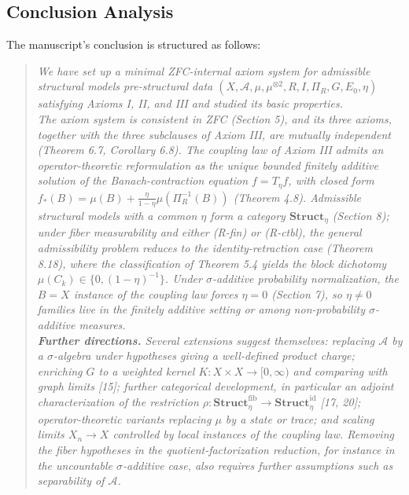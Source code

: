 \documentclass[11pt, a4paper]{article}
\begin{document}
\subsection{Conclusion Analysis}

The manuscript's conclusion is structured as follows:

\begin{quote}
    \small \textit{
    We have set up a minimal ZFC-internal axiom system for admissible structural models pre-structural data $(X, \mathcal{A}, \mu, \mu^{\otimes 2}, R, I, \Pi_R, G, E_0, \eta)$ satisfying Axioms I, II, and III and studied its basic properties. \\
    \indent The axiom system is consistent in ZFC (Section 5), and its three axioms, together with the three subclauses of Axiom III, are mutually independent (Theorem 6.7, Corollary 6.8). The coupling law of Axiom III admits an operator-theoretic reformulation as the unique bounded finitely additive solution of the Banach-contraction equation $f = T_\eta f$, with closed form $f_*(B) = \mu(B) + \frac{\eta}{1-\eta}\mu(\Pi_R^{-1}(B))$ (Theorem 4.8). Admissible structural models with a common $\eta$ form a category $\mathbf{Struct}_\eta$ (Section 8); under fiber measurability and either (R-fin) or (R-ctbl), the general admissibility problem reduces to the identity-retraction case (Theorem 8.18), where the classification of Theorem 5.4 yields the block dichotomy $\mu(C_k) \in \{0, (1-\eta)^{-1}\}$. Under $\sigma$-additive probability normalization, the $B = X$ instance of the coupling law forces $\eta = 0$ (Section 7), so $\eta \neq 0$ families live in the finitely additive setting or among non-probability $\sigma$-additive measures. \\
    \indent \textbf{Further directions.} Several extensions suggest themselves: replacing $\mathcal{A}$ by a $\sigma$-algebra under hypotheses giving a well-defined product charge; enriching $G$ to a weighted kernel $K : X \times X \to [0, \infty)$ and comparing with graph limits [15]; further categorical development, in particular an adjoint characterization of the restriction $\rho : \mathbf{Struct}_\eta^{\text{fib}} \to \mathbf{Struct}_\eta^{\text{id}}$ [17, 20]; operator-theoretic variants replacing $\mu$ by a state or trace; and scaling limits $X_n \to X$ controlled by local instances of the coupling law. Removing the fiber hypotheses in the quotient-factorization reduction, for instance in the uncountable $\sigma$-additive case, also requires further assumptions such as separability of $\mathcal{A}$.
    }
\end{quote}
\end{document}
